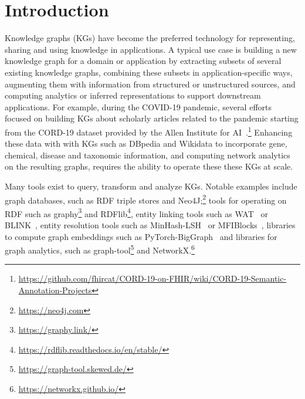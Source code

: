 \documentclass[runningheads]{llncs}
\newcommand{\kibitz}[2]{%
{\color{#1}#2}{}%
}
\newcommand{\pedro}[1]{\kibitz{orange}{[PS: #1]}} %
\newcommand{\DS}[1]{\kibitz{blue}{[DS: #1]}} %
\begin{document}

\setcounter{footnote}{0}

\section{Introduction}

Knowledge graphs (KGs) have become the preferred technology for representing, sharing and using knowledge in applications. A typical use case is building a new knowledge graph for a domain or application by extracting subsets of several existing knowledge graphs, combining these subsets in application-specific ways, augmenting them with information from structured or unstructured sources, and computing analytics or inferred representations to support downstream applications.
For example, during the COVID-19 pandemic, several efforts focused on building KGs about scholarly articles related to the pandemic starting from the CORD-19 dataset provided by the Allen Institute for AI~\cite{Wang2020}.\footnote{\url{https://github.com/fhircat/CORD-19-on-FHIR/wiki/CORD-19-Semantic-Annotation-Projects}} Enhancing these data with with KGs such as DBpedia \cite{dbpedia} and Wikidata \cite{vrandecic_wikidata:_2014} to incorporate gene, chemical, disease and taxonomic information, and computing network analytics on the resulting graphs, requires the ability to operate these these KGs at scale.

Many tools exist to query, transform and analyze KGs. Notable examples include graph databases, such as %
RDF triple stores and Neo4J;\footnote{\url{https://neo4j.com}} tools for operating on RDF such as graphy\footnote{\url{https://graphy.link/}} and RDFlib\footnote{\url{https://rdflib.readthedocs.io/en/stable/}}, %
entity linking tools such as WAT~\cite{piccinno2014tagme} or BLINK~\cite{wu2019zero}, entity resolution tools such as MinHash-LSH~\cite{leskovec2020mining} or MFIBlocks~\cite{kenig2013mfiblocks}, libraries to compute graph embeddings such as PyTorch-BigGraph~\cite{lerer2019pytorch} and libraries for graph analytics, such as graph-tool\footnote{\url{https://graph-tool.skewed.de/}} and NetworkX.\footnote{\url{https://networkx.github.io/}} 
\end{document}
